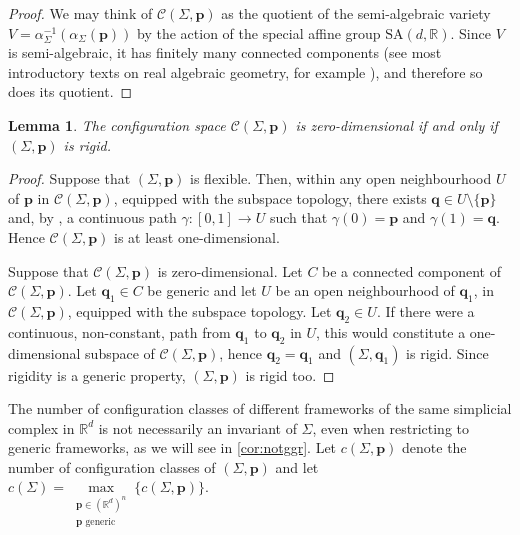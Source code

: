 \documentclass[11pt]{amsart}
\newtheorem{lemma}[theorem]{Lemma}
\theoremstyle{definition}
\theoremstyle{remark}
\begin{document}
\begin{proof}
    We may think of $\mathcal{C}(\Sigma,\mathbf{p})$ as the quotient of the semi-algebraic variety $V = \alpha_{\Sigma}^{-1}(\alpha_{\Sigma}(\mathbf{p}))$ by the action of the special affine group $\mathrm{SA}(d,\mathbb{R})$.
    Since $V$ is semi-algebraic, it has finitely many connected components (see most introductory texts on real algebraic geometry, for example \cite{bochnak2013real}), and therefore so does its quotient.
\end{proof}

\begin{lemma}
    The configuration space $\mathcal{C}(\Sigma,\mathbf{p})$ is zero-dimensional if and only if $(\Sigma,\mathbf{p})$ is rigid.
\end{lemma}

\begin{proof}
    Suppose that $(\Sigma,\mathbf{p})$ is flexible.
    Then, within any open neighbourhood $U$ of $\mathbf{p}$ in $\mathcal{C}(\Sigma,\mathbf{p})$, equipped with the subspace topology, there exists $\mathbf{q}\in U\setminus\{\mathbf{p}\}$ and, by , a continuous path $\gamma:[0,1]\rightarrow U$ such that $\gamma(0)=\mathbf{p}$ and $\gamma(1)=\mathbf{q}$.
    Hence $\mathcal{C}(\Sigma,\mathbf{p})$ is at least one-dimensional.

    Suppose that $\mathcal{C}(\Sigma,\mathbf{p})$ is zero-dimensional.
    Let $C$ be a connected component of $\mathcal{C}(\Sigma,\mathbf{p})$.
    Let $\mathbf{q}_1\in C$ be generic and let $U$ be an open neighbourhood of $\mathbf{q}_1$, in $\mathcal{C}(\Sigma,\mathbf{p})$, equipped with the subspace topology.
    Let $\mathbf{q}_2\in U$.
    If there were a continuous, non-constant, path from $\mathbf{q}_1$ to $\mathbf{q}_2$ in $U$, this would constitute a one-dimensional subspace of $\mathcal{C}(\Sigma,\mathbf{p})$, hence $\mathbf{q}_2=\mathbf{q}_1$ and $(\Sigma,\mathbf{q}_1)$ is rigid.
    Since rigidity is a generic property, $(\Sigma,\mathbf{p})$ is rigid too.
\end{proof}

The number of configuration classes of different frameworks of the same simplicial complex in $\mathbb{R}^d$ is not necessarily an invariant of $\Sigma$, even when restricting to generic frameworks, as we will see in \cref{cor:notggr}.
Let $c(\Sigma,\mathbf{p})$ denote the number of configuration classes of $(\Sigma,\mathbf{p})$ and let $c(\Sigma) = \max\limits_{\substack{\mathbf{p}\in(\mathbb{R}^d)^n \\ \mathbf{p}\text{ generic}}}\{c(\Sigma,\mathbf{p})\}$.
\end{document}
